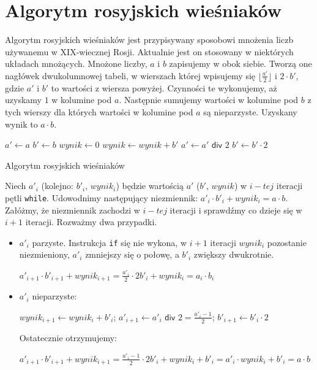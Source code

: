 \section{Algorytm rosyjskich wieśniaków}

Algorytm rosyjskich wieśniaków jest przypisywany sposobowi mnożenia liczb używanemu w XIX-wiecznej Rosji.
Aktualnie jest on stosowany w niektórych układach mnożących.
Mnożone liczby, $a$ i $b$ zapisujemy w obok siebie. 
Tworzą one nagłówek dwukolumnowej tabeli, w wierszach której wpisujemy się $\lfloor\frac{a'}{2}\rfloor$ i $2 \cdot b'$, gdzie $a'$ i $b'$ to wartości z wiersza powyżej. 
Czynności te wykonujemy, aż uzyskamy $1$ w kolumine pod $a$. 
Następnie sumujemy wartości w kolumine pod $b$ z tych wierszy dla których wartości w kolumine pod $a$ są nieparzyste.
Uzyskany wynik to $a \cdot b$.

\begin{algorithm}[h]
  \DontPrintSemicolon
  
  
  
  $a' \leftarrow a$\;
  $b' \leftarrow b$\;
  $wynik \leftarrow 0$\;
  {
    {
      $wynik \leftarrow wynik + b'$\;
    }
    $a' \leftarrow a' \textsf{ div } 2$\;
    $b' \leftarrow b' \cdot 2$\;
  }
  
  \caption{Algorytm rosyjskich wieśniaków}
  \label{alg-wiesniakow}
\end{algorithm}

Niech $a'_i$ (kolejno: $b'_i$, $wynik_i$) będzie wartością $a'$ ($b'$, $wynik$) w $i-tej$ iteracji pętli \texttt{while}. 
Udowodnimy następujący niezmiennik: $a'_i \cdot b'_i + wynik_i = a \cdot b$. 
Załóżmy, że niezmiennik zachodzi w $i-tej$ iteracji i sprawdźmy co dzieje się w $i+1$ iteracji.
Rozważmy dwa przypadki.


\begin{itemize}
    \item $a'_i$ parzyste. Instrukcja \texttt{if} się nie wykona, w $i+1$ iteracji $wynik_i$ pozostanie niezmieniony, $a'_i$ zmniejszy się o połowę, a $b'_i$ zwiększy dwukrotnie. 

$a'_{i+1} \cdot b'_{i+1} + wynik_{i+1} = \frac{a'_i}{2} \cdot 2 b'_i + wynik_i = a_i \cdot b_i$


\item $a'_i$ nieparzyste:

$wynik_{i+1} \leftarrow wynik_i + b'_i$;  
$a'_{i+1} \leftarrow a'_i \textsf{ div } 2 = \frac{a'_i-1}{2}$;  
$b'_{i+1} \leftarrow b'_i \cdot 2$

Ostatecznie otrzymujemy:

$a'_{i+1} \cdot b'_{i+1} + wynik_{i+1} = \frac{a'_i-1}{2} \cdot 2 b'_i + wynik_i +b'_i = a'_i \cdot wynik_i + b'_i= a \cdot b$

\end{itemize}

